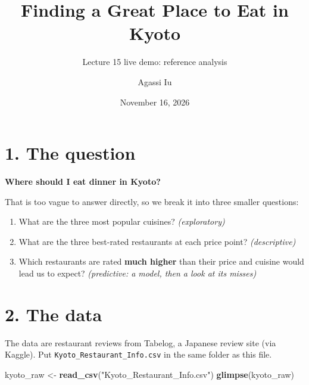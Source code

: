 \documentclass[
]{article}
\title{Finding a Great Place to Eat in Kyoto}
\subtitle{Lecture 15 live demo: reference analysis}
\author{Agassi Iu}
\date{November 16, 2026}
\newenvironment{Shaded}{\begin{snugshade}}{\end{snugshade}}
\newcommand{\FunctionTok}[1]{\textcolor[rgb]{0.13,0.29,0.53}{\textbf{#1}}}
\newcommand{\NormalTok}[1]{#1}
\newcommand{\OtherTok}[1]{\textcolor[rgb]{0.56,0.35,0.01}{#1}}
\newcommand{\StringTok}[1]{\textcolor[rgb]{0.31,0.60,0.02}{#1}}
\providecommand{\tightlist}{%
  \setlength{\itemsep}{0pt}\setlength{\parskip}{0pt}}
\begin{document}
\maketitle

{
\setcounter{tocdepth}{2}
\tableofcontents
}
\section{1. The question}\label{the-question}

\textbf{Where should I eat dinner in Kyoto?}

That is too vague to answer directly, so we break it into three smaller
questions:

\begin{enumerate}
\def\labelenumi{\arabic{enumi}.}
\tightlist
\item
  What are the three most popular cuisines? \emph{(exploratory)}
\item
  What are the three best-rated restaurants at each price point?
  \emph{(descriptive)}
\item
  Which restaurants are rated \textbf{much higher} than their price and
  cuisine would lead us to expect? \emph{(predictive: a model, then a
  look at its misses)}
\end{enumerate}

\section{2. The data}\label{the-data}

The data are restaurant reviews from Tabelog, a Japanese review site
(via Kaggle). Put \texttt{Kyoto\_Restaurant\_Info.csv} in the same
folder as this file.

\begin{Shaded}
\begin{Highlighting}[]
\NormalTok{kyoto\_raw }\OtherTok{\textless{}{-}} \FunctionTok{read\_csv}\NormalTok{(}\StringTok{"Kyoto\_Restaurant\_Info.csv"}\NormalTok{)}
\FunctionTok{glimpse}\NormalTok{(kyoto\_raw)}
\end{Highlighting}
\end{Shaded}
\end{document}
